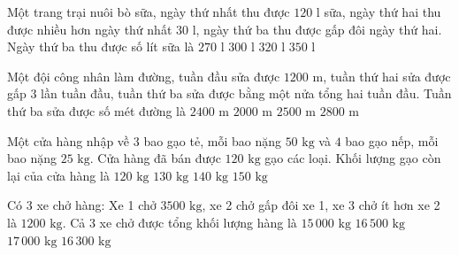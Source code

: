 \begin{ex} %
Một trang trại nuôi bò sữa, ngày thứ nhất thu được $120\text{ l}$ sữa, ngày thứ hai thu được nhiều hơn ngày thứ nhất $30\text{ l}$, ngày thứ ba thu được gấp đôi ngày thứ hai. Ngày thứ ba thu được số lít sữa là
\choice
{$270\text{ l}$}
{\True $300\text{ l}$}
{$320\text{ l}$}
{$350\text{ l}$}
\end{ex}

\begin{ex} %
Một đội công nhân làm đường, tuần đầu sửa được $1200\text{ m}$, tuần thứ hai sửa được gấp $3$ lần tuần đầu, tuần thứ ba sửa được bằng một nửa tổng hai tuần đầu. Tuần thứ ba sửa được số mét đường là
\choice
{\True $2400\text{ m}$}
{$2000\text{ m}$}
{$2500\text{ m}$}
{$2800\text{ m}$}
\end{ex}

\begin{ex} %
Một cửa hàng nhập về $3$ bao gạo tẻ, mỗi bao nặng $50\text{ kg}$ và $4$ bao gạo nếp, mỗi bao nặng $25\text{ kg}$. Cửa hàng đã bán được $120\text{ kg}$ gạo các loại. Khối lượng gạo còn lại của cửa hàng là
\choice
{$120\text{ kg}$}
{\True $130\text{ kg}$}
{$140\text{ kg}$}
{$150\text{ kg}$}
\end{ex}

\begin{ex} %
Có 3 xe chở hàng: Xe 1 chở $3500\text{ kg}$, xe 2 chở gấp đôi xe 1, xe 3 chở ít hơn xe 2 là $1200\text{ kg}$. Cả 3 xe chở được tổng khối lượng hàng là
\choice
{$15\,000\text{ kg}$}
{$16\,500\text{ kg}$}
{$17\,000\text{ kg}$}
{\True $16\,300\text{ kg}$}
\end{ex}

